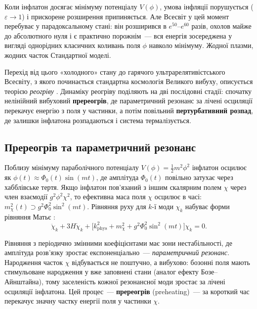 \documentclass[12pt, a4paper]{article}
\begin{document}
Коли інфлатон досягає мінімуму потенціалу $V(\phi)$, умова
інфляції порушується ($\varepsilon \to 1$) і прискорене
розширення припиняється. Але Всесвіт у цей момент
перебуває у парадоксальному стані: він розширився в
$e^{50}$--$e^{60}$ разів, охолов майже до абсолютного нуля
і є практично порожнім~--- вся енергія зосереджена у
вигляді однорідних класичних коливань поля $\phi$ навколо
мінімуму. Жодної плазми, жодних часток Стандартної моделі.

Перехід від цього «холодного» стану до гарячого
ультрарелятивістського Всесвіту, з якого починається
стандартна космологія Великого вибуху, описується теорією
\emph{реогріву} \cite{linde_1982, albrecht_1982}. Динаміку
реогріву поділяють на дві послідовні стадії: спочатку
нелінійний вибуховий \textbf{пререогрів}, де параметричний
резонанс за лічені осциляції перекачує енергію з поля у
частинки, а потім повільний \textbf{пертурбативний розпад},
де залишки інфлатона розпадаються і система термалізується.

\subsection{Пререогрів та параметричний резонанс}

Поблизу мінімуму параболічного потенціалу
$V(\phi) = \frac{1}{2}m^2\phi^2$ інфлатон осцилює як
$\phi(t) \approx \Phi_0(t)\sin(mt)$, де амплітуда
$\Phi_0(t)$ повільно затухає через хабблівське тертя.
Якщо інфлатон пов'язаний з іншим скалярним полем $\chi$
через член взаємодії $g^2\phi^2\chi^2$, то ефективна маса
поля $\chi$ осцилює в часі: $m_\chi^2(t) \supset
g^2\Phi_0^2\sin^2(mt)$. Рівняння руху для $k$-ї моди
$\chi_k$ набуває форми рівняння Матьє
\cite{kofman_1994, kofman_1997}:
\begin{equation}\label{eq:mathieu}
  \ddot{\chi}_k + 3H\dot{\chi}_k
  + \bigl[k_\mathrm{phys}^2 + m_\chi^2
         + g^2\Phi_0^2\sin^2(mt)\bigr]\chi_k = 0.
\end{equation}

Рівняння з періодично змінними коефіцієнтами має зони
нестабільності, де амплітуда розв'язку зростає
експоненціально~--- \emph{параметричний резонанс}.
Народження часток $\chi$ відбувається не поштучно, а
вибухово: бозонні поля мають стимульоване народження у
вже заповнені стани (аналог ефекту Бозе--Айнштайна), тому
заселеність кожної резонансної моди зростає за лічені
осциляції інфлатона. Цей процес~--- \textbf{пререогрів}
(preheating)~--- за короткий час перекачує значну частку
енергії поля у частинки $\chi$.
\end{document}
